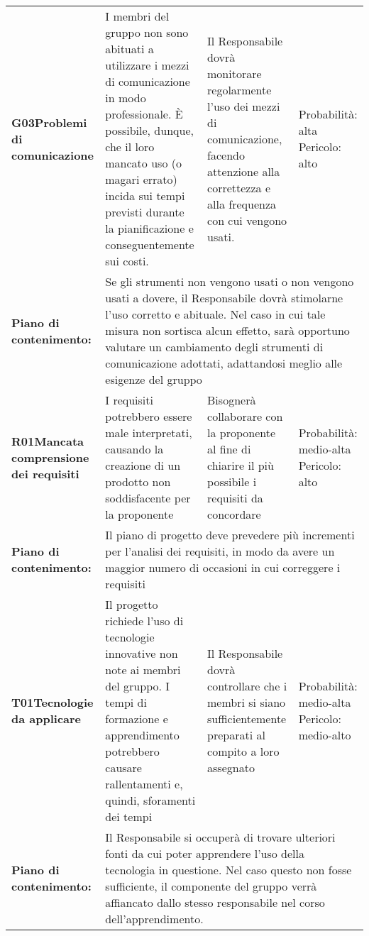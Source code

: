 \begin{longtable}{>{\bfseries}p{2.5cm} p{4.5cm} p{4.5cm} p{2.5cm}}
		\hline
		G03\newline Problemi di comunicazione
		&	I membri del gruppo non sono abituati a utilizzare i mezzi di comunicazione in modo professionale. \`E possibile, dunque, che il loro mancato uso (o magari errato) incida sui tempi previsti durante la pianificazione e conseguentemente sui costi. 
		& Il Responsabile dovrà monitorare regolarmente l'uso dei mezzi di comunicazione, facendo attenzione alla correttezza e alla frequenza con cui vengono usati.
		& Probabilità: alta \newline Pericolo: alto \\
		\rowcolor{LightGray}
		Piano di contenimento: 
		& \multicolumn{3}{p{12.5cm}}{Se gli strumenti non vengono usati o non vengono usati a dovere, il Responsabile dovrà stimolarne l'uso corretto e abituale. Nel caso in cui tale misura non sortisca alcun effetto, sarà opportuno valutare un cambiamento degli strumenti di comunicazione adottati, adattandosi meglio alle esigenze del gruppo}\\[0.5cm]

		\hline
		R01\newline Mancata comprensione dei requisiti 
		& I requisiti potrebbero essere male interpretati, causando la creazione di un prodotto non soddisfacente per la proponente
		& Bisognerà collaborare con la proponente al fine di chiarire il più possibile i requisiti da concordare &
		  Probabilità: medio-alta \newline Pericolo: alto \\
		\rowcolor{LightGray}
		Piano di contenimento: 
		& \multicolumn{3}{p{12.5cm}}{Il piano di progetto deve prevedere più incrementi per l'analisi dei requisiti, in modo da avere un maggior numero di occasioni in cui correggere i requisiti}\\[0.5cm]

		\hline
		T01\newline Tecnologie da applicare
		& Il progetto richiede l'uso di tecnologie innovative non note ai membri del gruppo. I tempi di formazione e apprendimento potrebbero causare rallentamenti e, quindi, sforamenti dei tempi 
		& Il Responsabile dovrà controllare che i membri si siano sufficientemente preparati al compito a loro assegnato 
		& Probabilità: medio-alta \newline Pericolo: medio-alto \\
		\rowcolor{LightGray}
		Piano di contenimento: 
		& \multicolumn{3}{p{12.5cm}}{Il Responsabile si occuperà di trovare ulteriori fonti da cui poter apprendere l'uso della tecnologia in questione. Nel caso questo non fosse sufficiente, il componente del gruppo verrà affiancato dallo stesso responsabile nel corso dell'apprendimento.}\\[0.5cm]


\end{longtable}
